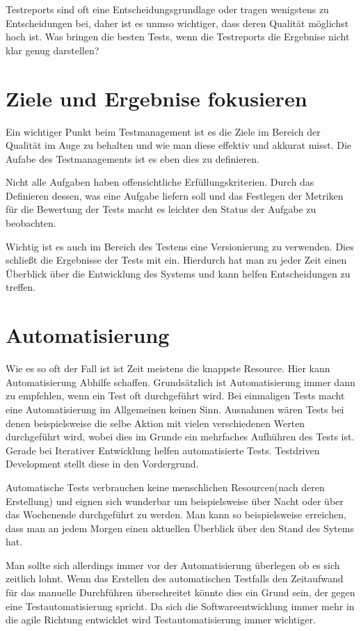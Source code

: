 Testreports sind oft eine Entscheidungsgrundlage oder tragen wenigstens zu Entscheidungen bei, daher ist es unmso wichtiger, dass deren Qualit\"at m\"oglichst hoch ist. Was bringen die besten Tests, wenn die Testreports die Ergebnise nicht klar genug darstellen?

\section{Ziele und Ergebnise fokusieren}
Ein wichtiger Punkt beim Testmanagement ist es die Ziele im Bereich der Qualit\"at im Auge zu behalten und wie man diese effektiv und akkurat misst. Die Aufabe des Testmanagements ist es eben dies zu definieren.

Nicht alle Aufgaben haben offensichtliche Erf\"ullungskriterien. Durch das Definieren dessen, was eine Aufgabe liefern soll und das Festlegen der Metriken f\"ur die Bewertung der Tests macht es leichter den Status der Aufgabe zu beobachten.

Wichtig ist es auch im Bereich des Testens eine Versionierung zu verwenden. Dies schließt die Ergebnisse der Tests mit ein. Hierdurch hat man zu jeder Zeit einen \"Uberblick \"uber die Entwicklung des Systems und kann helfen Entscheidungen zu treffen.

\section{Automatisierung}
Wie es so oft der Fall ist ist Zeit meistens die knappste Resource. Hier kann Automatisierung Abhilfe schaffen. Grunds\"atzlich ist Automatisierung immer dann zu empfehlen, wenn ein Test oft durchgef\"uhrt wird. Bei einmaligen Tests macht eine Automatisierung im Allgemeinen keinen Sinn. Ausnahmen w\"aren Tests bei denen beispielsweise die selbe Aktion mit vielen verschiedenen Werten durchgef\"uhrt wird, wobei dies im Grunde ein mehrfaches Aufh\"uhren des Tests ist. Gerade bei Iterativer Entwicklung helfen automatisierte Tests. Testdriven Development stellt diese in den Vordergrund.

Automatische Tests verbrauchen keine menschlichen Resourcen(nach deren Erstellung) und eignen sich wunderbar um beispielsweise \"uber Nacht oder \"uber das Wochenende durchgef\"uhrt zu werden. Man kann so beispielsweise erreichen, dass man an jedem Morgen einen aktuellen \"Uberblick \"uber den Stand des Sytems hat.

Man sollte sich allerdings immer vor der Automatisierung \"uberlegen ob es sich zeitlich lohnt. Wenn das Erstellen des automatischen Testfalls den Zeitaufwand f\"ur das manuelle Durchf\"uhren \"uberschreitet k\"onnte dies ein Grund sein, der gegen eine Testautomatisierung spricht. Da sich die Softwareentwicklung immer mehr in die agile Richtung entwicklet wird Testautomatisierung immer wichtiger.
